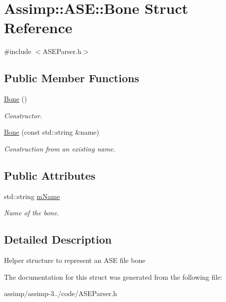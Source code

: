 \hypertarget{struct_assimp_1_1_a_s_e_1_1_bone}{\section{Assimp\+:\+:A\+S\+E\+:\+:Bone Struct Reference}
\label{struct_assimp_1_1_a_s_e_1_1_bone}
}


{\ttfamily \#include $<$A\+S\+E\+Parser.\+h$>$}

\subsection*{Public Member Functions}
\begin{DoxyCompactItemize}
\item 
\hypertarget{struct_assimp_1_1_a_s_e_1_1_bone_afb30e912320ec1537b14ec6eeec1978d}{\hyperlink{struct_assimp_1_1_a_s_e_1_1_bone_afb30e912320ec1537b14ec6eeec1978d}{Bone} ()}\label{struct_assimp_1_1_a_s_e_1_1_bone_afb30e912320ec1537b14ec6eeec1978d}

\begin{DoxyCompactList}\small\item\em Constructor. \end{DoxyCompactList}\item 
\hypertarget{struct_assimp_1_1_a_s_e_1_1_bone_ade57feefb9b83cafa45b3ff341cc116a}{\hyperlink{struct_assimp_1_1_a_s_e_1_1_bone_ade57feefb9b83cafa45b3ff341cc116a}{Bone} (const std\+::string \&name)}\label{struct_assimp_1_1_a_s_e_1_1_bone_ade57feefb9b83cafa45b3ff341cc116a}

\begin{DoxyCompactList}\small\item\em Construction from an existing name. \end{DoxyCompactList}\end{DoxyCompactItemize}
\subsection*{Public Attributes}
\begin{DoxyCompactItemize}
\item 
\hypertarget{struct_assimp_1_1_a_s_e_1_1_bone_acd01a2aa66317a44ff67213f4ed25a80}{std\+::string \hyperlink{struct_assimp_1_1_a_s_e_1_1_bone_acd01a2aa66317a44ff67213f4ed25a80}{m\+Name}}\label{struct_assimp_1_1_a_s_e_1_1_bone_acd01a2aa66317a44ff67213f4ed25a80}

\begin{DoxyCompactList}\small\item\em Name of the bone. \end{DoxyCompactList}\end{DoxyCompactItemize}


\subsection{Detailed Description}
Helper structure to represent an A\+S\+E file bone 

The documentation for this struct was generated from the following file\+:\begin{DoxyCompactItemize}
\item 
assimp/assimp-\/3../code/A\+S\+E\+Parser.\+h\end{DoxyCompactItemize}
